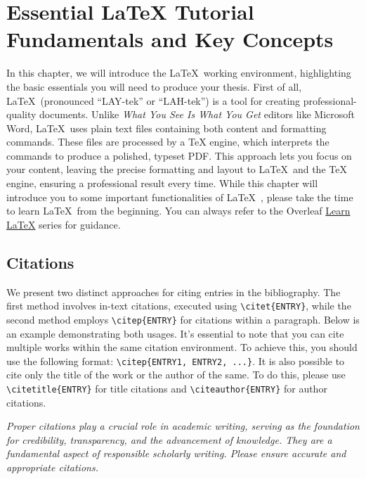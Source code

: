 \chapter[Essential LaTeX Tutorial: Fundamentals and Key Concepts]{Essential LaTeX Tutorial Fundamentals and Key Concepts}
\label{cp:latex-tutorial}

{
\parindent0pt

In this chapter, we will introduce the \LaTeX~working environment, highlighting the basic essentials you will need to produce your thesis. First of all, \LaTeX~(pronounced ``LAY-tek'' or ``LAH-tek'') is a tool for creating professional-quality documents. Unlike \textit{What You See Is What You Get} editors like Microsoft Word, \LaTeX~uses plain text files containing both content and formatting commands. These files are processed by a TeX engine, which interprets the commands to produce a polished, typeset PDF. This approach lets you focus on your content, leaving the precise formatting and layout to \LaTeX~and the TeX engine, ensuring a professional result every time. While this chapter will introduce you to some important functionalities of \LaTeX~, please take the time to learn \LaTeX~from the beginning. You can always refer to the Overleaf \href{https://www.overleaf.com/learn/latex/Learn_LaTeX_in_30_minutes}{Learn LaTeX} series for guidance.


\section{Citations}
\label{sec:citations}
We present two distinct approaches for citing entries in the bibliography. The first method involves in-text citations, executed using \verb|\citet{ENTRY}|, while the second method employs \verb|\citep{ENTRY}| for citations within a paragraph. Below is an example demonstrating both usages. It's essential to note that you can cite multiple works within the same citation environment. To achieve this, you should use the following format: \verb|\citep{ENTRY1, ENTRY2, ...}|. It is also possible to cite only the title of the work or the author of the same. To do this, please use \verb|\citetitle{ENTRY}| for title citations and \verb|\citeauthor{ENTRY}| for author citations.

\begin{block}[tip]
\textit{Proper citations play a crucial role in academic writing, serving as the foundation for credibility, transparency, and the advancement of knowledge. They are a fundamental aspect of responsible scholarly writing. Please ensure accurate and appropriate citations.}
\end{block}

}
